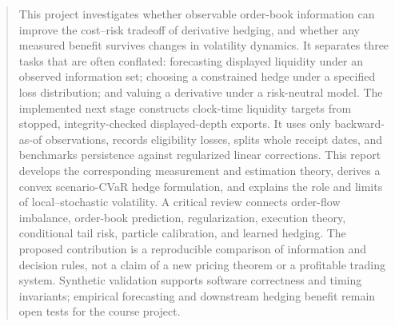 \documentclass[11pt,a4paper]{article}
\begin{document}
\begin{abstract}
This project investigates whether observable order-book information can improve the cost--risk tradeoff of derivative hedging, and whether any measured benefit survives changes in volatility dynamics. It separates three tasks that are often conflated: forecasting displayed liquidity under an observed information set; choosing a constrained hedge under a specified loss distribution; and valuing a derivative under a risk-neutral model. The implemented next stage constructs clock-time liquidity targets from stopped, integrity-checked displayed-depth exports. It uses only backward-as-of observations, records eligibility losses, splits whole receipt dates, and benchmarks persistence against regularized linear corrections. This report develops the corresponding measurement and estimation theory, derives a convex scenario-CVaR hedge formulation, and explains the role and limits of local--stochastic volatility. A critical review connects order-flow imbalance, order-book prediction, regularization, execution theory, conditional tail risk, particle calibration, and learned hedging. The proposed contribution is a reproducible comparison of information and decision rules, not a claim of a new pricing theorem or a profitable trading system. Synthetic validation supports software correctness and timing invariants; empirical forecasting and downstream hedging benefit remain open tests for the course project.
\end{abstract}
\tableofcontents
\newpage





\clearpage


\end{document}

